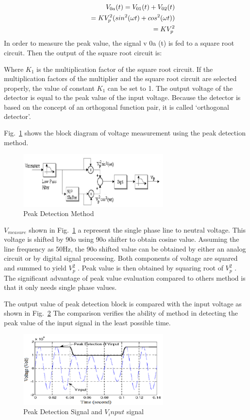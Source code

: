 \documentclass[journal,twoside]{IEEEtran}
\begin{document}
\begin{align}
V_{0a}(t) = V_{01}(t)+ V_{02}(t)\notag\\
\qquad = KV_p^2 (sin^2(\omega t) + cos^2 (\omega t) )\notag\\
\qquad = KV_p^2
\end{align}
In order to measure the peak value, the signal v 0a (t) is
fed to a square root circuit. Then the output of the square
root circuit is:

Where $K_1$ is the multiplication factor of the square root
circuit. If the multiplication factors of the multiplier and
the square root circuit are selected properly, the value of
constant $K_1$ can be set to 1. The output voltage of the
detector is equal to the peak value of the input voltage.
Because the detector is based on the concept of an
orthogonal function pair, it is called \lq orthogonal
detector\rq.

Fig.~\ref{f2} shows the block diagram of voltage measurement
using the peak detection method.


\begin{figure}[!ht]
\centering
\includegraphics[width=3in]{2}
\caption{Peak Detection Method}
\label{f2}
\end{figure}


$V_{measure}$ shown in Fig.~\ref{f2} a represent the single phase line
to neutral voltage. This voltage is shifted by 90o using
90o shifter to obtain cosine value. Assuming the line
frequency as 50Hz, the 90o shifted value can be obtained
by either an analog circuit or by digital signal
processing. Both components of voltage are squared and
summed to yield $V_p^2$ . Peak value is then obtained by
squaring root of $V_p^2$ . The significant advantage of peak
value evaluation compared to others method is that it
only needs single phase values.

The output value of peak detection block is compared
with the input voltage as shown in Fig.~\ref{f3} The comparison
verifies the ability of method in detecting the peak value
of the input signal in the least possible time.
\begin{figure}[!ht]
\centering
\includegraphics[width=3in]{3}
\caption{Peak Detection Signal and $V_input$ signal}
\label{f3}
\end{figure}
\end{document}
